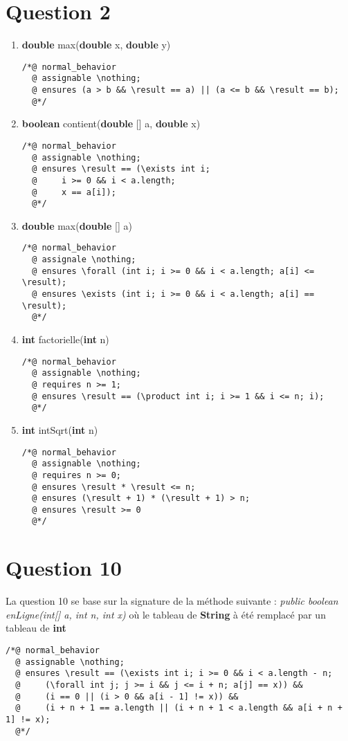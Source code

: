\documentclass{article}
\begin{document}
\section{Question 2}
\begin{enumerate}
	\item \textbf{double} max(\textbf{double} x, \textbf{double} y)
\begin{lstlisting}
/*@ normal_behavior
  @ assignable \nothing;
  @ ensures (a > b && \result == a) || (a <= b && \result == b);
  @*/
\end{lstlisting}
	\item \textbf{boolean} contient(\textbf{double} [] a, \textbf{double} x)
\begin{lstlisting}
/*@ normal_behavior
  @ assignable \nothing;
  @ ensures \result == (\exists int i;
  @		i >= 0 && i < a.length;
  @		x == a[i]);
  @*/
\end{lstlisting}
	\item \textbf{double} max(\textbf{double} [] a)
\begin{lstlisting}
/*@ normal_behavior
  @ assignale \nothing;
  @ ensures \forall (int i; i >= 0 && i < a.length; a[i] <= \result);
  @ ensures \exists (int i; i >= 0 && i < a.length; a[i] == \result);
  @*/
\end{lstlisting}
	\item \textbf{int} factorielle(\textbf{int} n)
\begin{lstlisting}
/*@ normal_behavior
  @ assignable \nothing;
  @ requires n >= 1;
  @ ensures \result == (\product int i; i >= 1 && i <= n; i);
  @*/
\end{lstlisting}
	\item \textbf{int} intSqrt(\textbf{int} n)
\begin{lstlisting}
/*@ normal_behavior
  @ assignable \nothing;
  @ requires n >= 0;
  @ ensures \result * \result <= n;
  @ ensures (\result + 1) * (\result + 1) > n;
  @ ensures \result >= 0
  @*/
\end{lstlisting}
\end{enumerate}

\section{Question 10}
La question 10 se base sur la signature de la méthode suivante : \textit{public boolean enLigne(int[] a, int n, int x)} où le tableau de \textbf{String} à été remplacé par un tableau de \textbf{int}
\begin{lstlisting}
/*@ normal_behavior
  @ assignable \nothing;
  @ ensures \result == (\exists int i; i >= 0 && i < a.length - n;
  @		(\forall int j; j >= i && j <= i + n; a[j] == x)) && 
  @	 	(i == 0 || (i > 0 && a[i - 1] != x)) &&
  @	 	(i + n + 1 == a.length || (i + n + 1 < a.length && a[i + n + 1] != x);
  @*/
\end{lstlisting}
\end{document}
